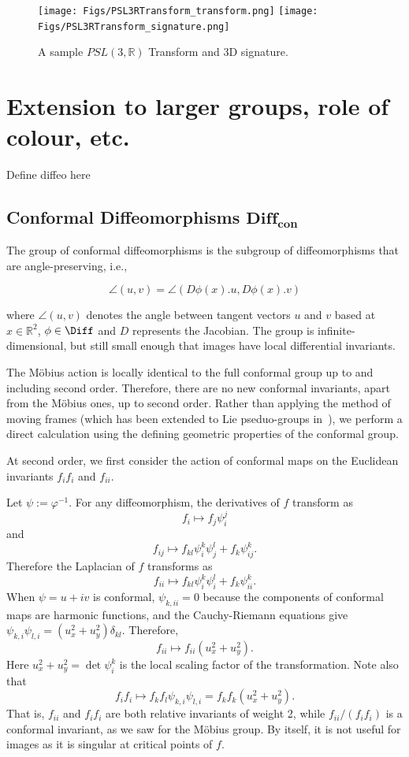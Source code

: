 \documentclass[review,onefignum,onetabnum]{siamonline190516}
\begin{document}
\begin{figure}
\centering
\texttt{[image: Figs/PSL3RTransform\_transform.png]}
\texttt{[image: Figs/PSL3RTransform\_signature.png]}
\caption{A sample $PSL(3,\mathbb{R})$ Transform and 3D signature.}
\label{fig:PSL3R}
\end{figure}

\section{Extension to larger groups, role of colour, etc.}

Define diffeo here

\subsection{Conformal Diffeomorphisms $\mathbf{Diff}_{\mathbf{con}}$}

The group of conformal diffeomorphisms is the subgroup of diffeomorphisms that are angle-preserving, i.e.,

\begin{equation}
\angle (u,v) = \angle (D \phi(x) . u, D \phi(x).v)
\end{equation}

\noindent where $\angle(u, v)$ denotes the angle between tangent vectors $u$ and $v$ based at $x \in \mathbb{R}^2$, $\phi \in \Diff$ and $D$ represents the Jacobian. The group is infinite-dimensional, but still small enough that images have local differential invariants.

The M\"obius action is locally identical to the full conformal group up to and including second order. Therefore, there are no new conformal invariants, apart from the M\"obius ones, up to second order. Rather than applying the method of moving frames (which has been extended to Lie pseduo-groups in~\cite{}), we perform a direct calculation using the defining geometric properties of the conformal group.

At second order, we first consider the action of conformal maps on the Euclidean invariants $f_i f_i$ and $f_{ii}$.

Let $\psi := \varphi^{-1}$. For any diffeomorphism, the derivatives of $f$ transform as
$$f_i \mapsto f_j \psi^j_i$$
and
$$f_{ij} \mapsto f_{kl} \psi^k_i\psi^l_j + f_{k}\psi^k_{ij}.$$
Therefore the Laplacian of $f$ transforms as
$$ f_{ii} \mapsto f_{kl} \psi^k_i \psi^l_i + f_k \psi^k_{ii}.$$
When $\psi=u + i v$ is conformal, $\psi_{k,ii}=0$ because the components of conformal maps are harmonic functions,
and the Cauchy-Riemann equations give $\psi_{k,i}\psi_{l,i} = (u_x^2 + u_y^2)\delta_{kl}$. Therefore,
$$ f_{ii} \mapsto f_{ii}(u_x^2+u_y^2).$$
Here $u_x^2+u_y^2=\det\psi^k_i$ is the local scaling factor of the transformation.
Note also that
$$f_i f_i \mapsto f_k f_l \psi_{k,i} \psi_{l,i} = f_k f_k (u_x^2 + u_y^2).$$
That is, $f_{ii}$ and $f_i f_i$ are both relative invariants of weight 2, while $f_{ii}/(f_i f_i)$ is a conformal invariant, as we saw for the M\"obius group. By itself, it is not useful for images as it is singular at critical points of $f$.
\end{document}
